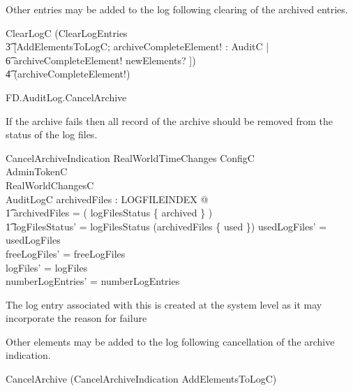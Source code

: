 Other entries may be added to the log following clearing of the
archived entries.

\begin{zed}
        ClearLogC  (ClearLogEntries \semi 
\\ \t3  [AddElementsToLogC; archiveCompleteElement! : AuditC | 
\\ \t6 archiveCompleteElement! \in
newElements? ]) 
\\ \t4        \hide (archiveCompleteElement!)
\end{zed}


\begin{traceunit}{FD.AuditLog.CancelArchive}
\end{traceunit}

If the archive fails then all record of the archive should be removed
from the status of the log files.

\begin{schema}{CancelArchiveIndication}
        RealWorldTimeChanges
\also
        ConfigC
\\      AdminTokenC
\\      RealWorldChangesC
\\      \Delta AuditLogC
\where
        \exists archivedFiles : \finset LOGFILEINDEX @
\\ \t1        archivedFiles = \dom ( logFilesStatus \rres 
\{ archived \} )
\\ \t1     \land logFilesStatus' = logFilesStatus \oplus (archivedFiles
\cross \{ used \})
\also
          usedLogFiles' = usedLogFiles 
\\        freeLogFiles' = freeLogFiles 
\\        logFiles' = logFiles 
\\        numberLogEntries' = numberLogEntries 
\end{schema}
\begin{Zcomment}
\item
The log entry associated with this is created at the system level as
it may incorporate the reason for failure
\end{Zcomment}

Other elements may be added to the log following cancellation of the
archive indication.

\begin{zed}
        CancelArchive  (CancelArchiveIndication \semi
        AddElementsToLogC)
\end{zed}

